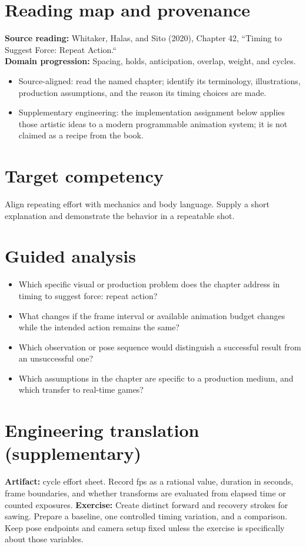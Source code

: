 \documentclass[10pt,letterpaper]{article}
\begin{document}
\makedoctitle
\makedocsummary

\section{Reading map and provenance}
\textbf{Source reading:} Whitaker, Halas, and Sito (2020), Chapter 42, ``Timing to Suggest Force: Repeat Action.``\\
\textbf{Domain progression:} Spacing, holds, anticipation, overlap, weight, and cycles.
\begin{itemize}
\item Source-aligned: read the named chapter; identify its terminology, illustrations, production assumptions, and the reason its timing choices are made.
\item Supplementary engineering: the implementation assignment below applies those artistic ideas to a modern programmable animation system; it is not claimed as a recipe from the book.
\end{itemize}
\section{Target competency}
Align repeating effort with mechanics and body language. Supply a short explanation and demonstrate the behavior in a repeatable shot.
\section{Guided analysis}
\begin{itemize}
\item Which specific visual or production problem does the chapter address in timing to suggest force: repeat action?
\item What changes if the frame interval or available animation budget changes while the intended action remains the same?
\item Which observation or pose sequence would distinguish a successful result from an unsuccessful one?
\item Which assumptions in the chapter are specific to a production medium, and which transfer to real-time games?
\end{itemize}
\section{Engineering translation (supplementary)}
\textbf{Artifact:} cycle effort sheet. Record fps as a rational value, duration in seconds, frame boundaries, and whether transforms are evaluated from elapsed time or counted exposures.
\textbf{Exercise:} Create distinct forward and recovery strokes for sawing. Prepare a baseline, one controlled timing variation, and a comparison. Keep pose endpoints and camera setup fixed unless the exercise is specifically about those variables.
\end{document}
